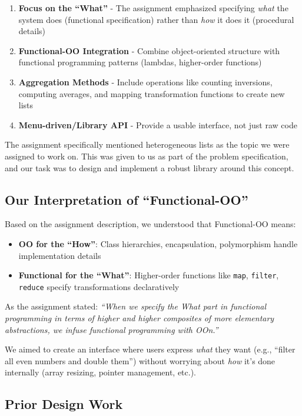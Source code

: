 \documentclass[11pt,a4paper]{article}
\begin{document}
\begin{enumerate}
    \item \textbf{Focus on the ``What''} - The assignment emphasized specifying \textit{what} the system does (functional specification) rather than \textit{how} it does it (procedural details)
    \item \textbf{Functional-OO Integration} - Combine object-oriented structure with functional programming patterns (lambdas, higher-order functions)
    \item \textbf{Aggregation Methods} - Include operations like counting inversions, computing averages, and mapping transformation functions to create new lists
    \item \textbf{Menu-driven/Library API} - Provide a usable interface, not just raw code
\end{enumerate}

The assignment specifically mentioned heterogeneous lists as the topic we were assigned to work on. This was given to us as part of the problem specification, and our task was to design and implement a robust library around this concept.

\subsection{Our Interpretation of ``Functional-OO''}

Based on the assignment description, we understood that Functional-OO means:
\begin{itemize}
    \item \textbf{OO for the ``How''}: Class hierarchies, encapsulation, polymorphism handle implementation details
    \item \textbf{Functional for the ``What''}: Higher-order functions like \texttt{map}, \texttt{filter}, \texttt{reduce} specify transformations declaratively
\end{itemize}

As the assignment stated: \textit{``When we specify the What part in functional programming in terms of higher and higher composites of more elementary abstractions, we infuse functional programming with OOn.''}

We aimed to create an interface where users express \textit{what} they want (e.g., ``filter all even numbers and double them'') without worrying about \textit{how} it's done internally (array resizing, pointer management, etc.).

\subsection{Prior Design Work}
\end{document}
